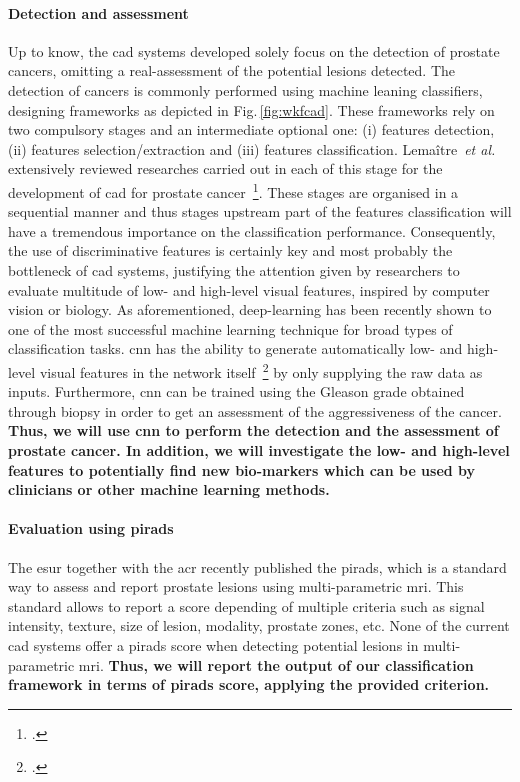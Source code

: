 \paragraph{Detection and assessment}

Up to know, the \ac{cad} systems developed solely focus on the detection of prostate cancers, omitting a real-assessment of the potential lesions detected.
The detection of cancers is commonly performed using machine leaning classifiers, designing frameworks as depicted in Fig.\,\ref{fig:wkfcad}.
These frameworks rely on two compulsory stages and an intermediate optional one: (i) features detection, (ii) features selection/extraction and (iii) features classification.
Lema\^itre~\emph{et al.} extensively reviewed researches carried out in each of this stage for the development of \ac{cad} for prostate cancer~\footcite{Lemaitre2015}.
These stages are organised in a sequential manner and thus stages upstream part of the features classification will have a tremendous importance on the classification performance.
Consequently, the use of discriminative features is certainly key and most probably the bottleneck of \ac{cad} systems, justifying the attention given by researchers to evaluate multitude of low- and high-level visual features, inspired by computer vision or biology.
As aforementioned, deep-learning has been recently shown to one of the most successful machine learning technique for broad types of classification tasks.
\ac{cnn} has the ability to generate automatically low- and high-level visual features in the network itself~\footcite{Zeiler2013} by only supplying the raw data as inputs.
Furthermore, \ac{cnn} can be trained using the Gleason grade obtained through biopsy in order to get an assessment of the aggressiveness of the cancer.
\textbf{Thus, we will use \ac{cnn} to perform the detection and the assessment of prostate cancer. In addition, we will investigate the low- and high-level features to potentially find new bio-markers which can be used by clinicians or other machine learning methods.}

\paragraph{Evaluation using \acs*{pirads}}

The \ac{esur} together with the \ac{acr} recently published the \ac{pirads}, which is a standard way to assess and report prostate lesions using multi-parametric \ac{mri}.
This standard allows to report a score depending of multiple criteria such as signal intensity, texture, size of lesion, modality, prostate zones, etc.
None of the current \ac{cad} systems offer a \ac{pirads} score when detecting potential lesions in multi-parametric \ac{mri}.
\textbf{Thus, we will report the output of our classification framework in terms of \ac{pirads} score, applying the provided criterion.}

